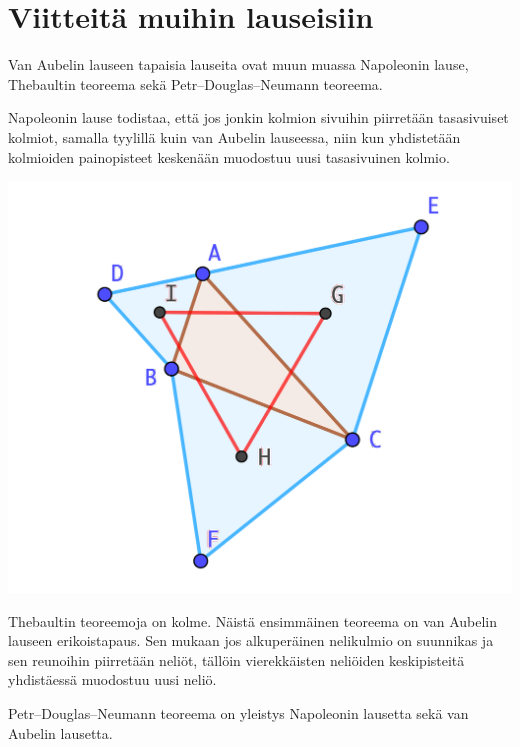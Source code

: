 \documentclass{scrartcl}
\begin{document}
\pagebreak
\section{Viitteitä muihin lauseisiin}

Van Aubelin lauseen tapaisia lauseita ovat muun muassa Napoleonin lause, Thebaultin teoreema sekä Petr–Douglas–Neumann teoreema.

Napoleonin lause todistaa, että jos jonkin kolmion sivuihin piirretään tasasivuiset kolmiot, samalla tyylillä kuin van Aubelin lauseessa, niin kun yhdistetään kolmioiden painopisteet keskenään muodostuu uusi tasasivuinen kolmio.
\begin{center}
    \includegraphics[scale=0.6]{Napoleonin.png}
\end{center}

Thebaultin teoreemoja on kolme. Näistä ensimmäinen teoreema on van Aubelin lauseen erikoistapaus. Sen mukaan jos alkuperäinen nelikulmio on suunnikas ja sen reunoihin piirretään neliöt, tällöin vierekkäisten neliöiden keskipisteitä yhdistäessä muodostuu uusi neliö.

Petr–Douglas–Neumann teoreema on yleistys Napoleonin lausetta sekä van Aubelin lausetta.


\pagebreak
\end{document}

